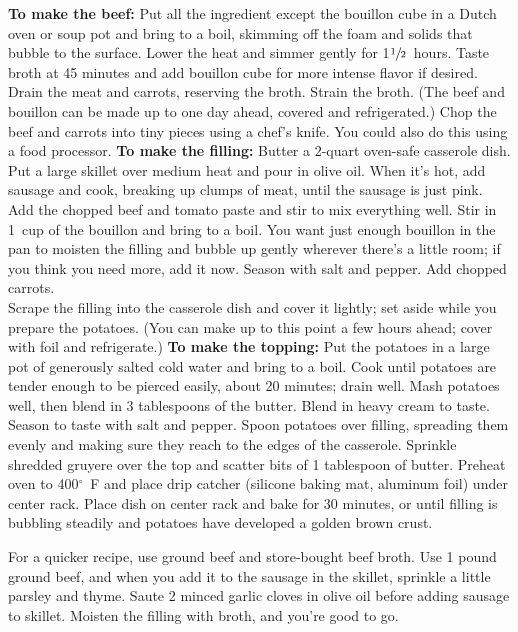 \begin{recipe}
    \preparation
    {
        \step \textbf{To make the beef:} Put all the ingredient except the bouillon cube in a Dutch oven or soup pot and bring to a boil, skimming off the foam and solids that bubble to the surface. Lower the heat and simmer gently for 1$\sfrac{1}{2}$~hours. Taste broth at 45 minutes and add bouillon cube for more intense flavor if desired. 
		\step Drain the meat and carrots, reserving the broth. Strain the broth. (The beef and bouillon can be made up to one day ahead, covered and refrigerated.)
		\step Chop the beef and carrots into tiny pieces using a chef's knife. You could also do this using a food processor.
		\step \textbf{To make the filling:} Butter a 2-quart oven-safe casserole dish.
		\step Put a large skillet over medium heat and pour in olive oil. When it's hot, add sausage and cook, breaking up clumps of meat, until the sausage is just pink. 
		\step Add the chopped beef and tomato paste and stir to mix everything well. 
		\step Stir in 1~cup of the bouillon and bring to a boil. You want just enough bouillon in the pan to moisten the filling and bubble up gently wherever there's a little room; if you think you need more, add it now. Season with salt and pepper.
		\step Add chopped carrots.
		\\
		\step Scrape the filling into the casserole dish and cover it lightly; set aside while you prepare the potatoes. (You can make up to this point a few hours ahead; cover with foil and refrigerate.)
		\step \textbf{To make the topping:} Put the potatoes in a large pot of generously salted cold water and bring to a boil. Cook until potatoes are tender enough to be pierced easily, about 20 minutes; drain well. 
		\step Mash potatoes well, then blend in 3 tablespoons of the butter. Blend in heavy cream to taste. Season to taste with salt and pepper.
		\step Spoon potatoes over filling, spreading them evenly and making sure they reach to the edges of the casserole. Sprinkle shredded gruyere over the top and scatter bits of 1 tablespoon of butter.
		\step Preheat oven to 400$^{\circ}$~F and place drip catcher (silicone baking mat, aluminum foil) under center rack. Place dish on center rack and bake for 30 minutes, or until filling is bubbling steadily and potatoes have developed a golden brown crust.
    }
	
	\suggestion
	{
		For a quicker recipe, use ground beef and store-bought beef broth. Use 1 pound ground beef, and when you add it to the sausage in the skillet, sprinkle a little parsley and thyme. Saute 2 minced garlic cloves in olive oil before adding sausage to skillet. Moisten the filling with broth, and you're good to go. 
	}

\end{recipe}
